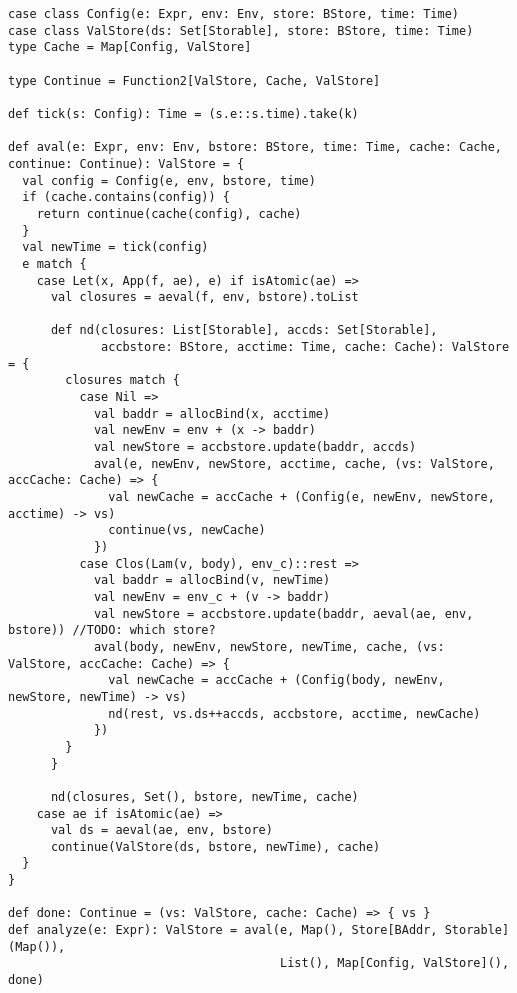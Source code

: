 \documentclass[acmsmall,review,anonymous]{acmart}\settopmatter{printfolios=true,printccs=false,printacmref=false}
\begin{document}
\begin{lstlisting}
case class Config(e: Expr, env: Env, store: BStore, time: Time)
case class ValStore(ds: Set[Storable], store: BStore, time: Time)
type Cache = Map[Config, ValStore]

type Continue = Function2[ValStore, Cache, ValStore]

def tick(s: Config): Time = (s.e::s.time).take(k)

def aval(e: Expr, env: Env, bstore: BStore, time: Time, cache: Cache, continue: Continue): ValStore = { 
  val config = Config(e, env, bstore, time)
  if (cache.contains(config)) {
    return continue(cache(config), cache)
  }   
  val newTime = tick(config)
  e match {
    case Let(x, App(f, ae), e) if isAtomic(ae) =>
      val closures = aeval(f, env, bstore).toList

      def nd(closures: List[Storable], accds: Set[Storable],
             accbstore: BStore, acctime: Time, cache: Cache): ValStore  = { 
        closures match {
          case Nil =>
            val baddr = allocBind(x, acctime)
            val newEnv = env + (x -> baddr)
            val newStore = accbstore.update(baddr, accds)
            aval(e, newEnv, newStore, acctime, cache, (vs: ValStore, accCache: Cache) => {
              val newCache = accCache + (Config(e, newEnv, newStore, acctime) -> vs) 
              continue(vs, newCache)
            })  
          case Clos(Lam(v, body), env_c)::rest =>
            val baddr = allocBind(v, newTime)
            val newEnv = env_c + (v -> baddr)
            val newStore = accbstore.update(baddr, aeval(ae, env, bstore)) //TODO: which store?
            aval(body, newEnv, newStore, newTime, cache, (vs: ValStore, accCache: Cache) => {
              val newCache = accCache + (Config(body, newEnv, newStore, newTime) -> vs) 
              nd(rest, vs.ds++accds, accbstore, acctime, newCache)
            })  
        }   
      }   

      nd(closures, Set(), bstore, newTime, cache)
    case ae if isAtomic(ae) =>
      val ds = aeval(ae, env, bstore)
      continue(ValStore(ds, bstore, newTime), cache)
  }   
}

def done: Continue = (vs: ValStore, cache: Cache) => { vs }                                                                                                                                                                                                 
def analyze(e: Expr): ValStore = aval(e, Map(), Store[BAddr, Storable](Map()),
                                      List(), Map[Config, ValStore](), done)
\end{lstlisting}
\end{document}
